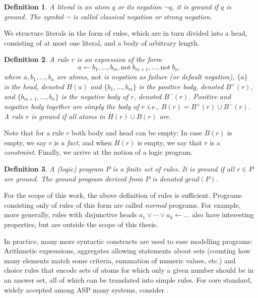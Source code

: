 \documentclass{vutinfth} %
\newtheorem{definition}{Definition}[section]
\newcommand{\headf}{H}
\newcommand{\bodyf}{B}
\newcommand{\fail}{\mathrm{not } \ \xspace}
\newcommand{\from}{\ensuremath{\leftarrow}}
\begin{document}
\begin{definition}
A \emph{literal} is an atom $q$ or its negation $\neg q$, it is \emph{ground} if $q$ is ground. The symbol $\neg$ is called \emph{classical negation} or \emph{strong negation}.
\end{definition}

We structure literals in the form of rules, which are in turn divided into a head, consisting of at most one literal, and a body of arbitrary length.

\begin{definition}
A \emph{rule} $r$ is an expression of the form $$a \from b_1, \ldots, b_m, \fail b_{m+1}, \ldots, \fail b_n.$$ where $a, b_1, \ldots, b_n$ are atoms, $\mathrm{not}$ is \emph{negation as failure} (or \emph{default negation}), $\{ a \}$ is the \emph{head}, denoted $\headf(a)$ and $\{ b_1, \ldots, b_m \}$ is the \emph{positive body}, denoted $\bodyf^+(r)$, and $\{ b_{m+1}, \ldots, b_n \}$ is the \emph{negative body} of $r$, denoted $\bodyf^-(r)$. Positive and negative body together are simply the \emph{body} of $r$ i.e., $\bodyf(r) = \bodyf^+(r)\cup \bodyf^-(r)$.
A rule $r$ is \emph{ground} if all atoms in $\headf(r) \cup \bodyf(r)$ are.
\end{definition}

Note that for a rule $r$ both body and head can be empty: In case $\bodyf(r)$ is empty, we say $r$ is a \emph{fact}, and when $\headf(r)$ is empty, we say that $r$ is a \emph{constraint}. Finally, we arrive at the notion of a logic program.

\begin{definition}
A \emph{(logic) program} $P$ is a finite set of rules. It is \emph{ground} if all $r \in P$ are ground. The ground program derived from $P$ is denoted $grnd(P)$.
\end{definition}

For the scope of this work, the above definition of rules is sufficient. Programs consisting only of rules of this form are called \emph{normal} programs. For example, more generally, rules with disjunctive heads $a_1 \vee \cdots \vee a_k \from \ldots$ also have interesting properties, but are outside the scope of this thesis.

In practice, many more syntactic constructs are used to ease modelling programs: Arithmetic expressions, aggregates allowing statements about sets (counting how many elements match some criteria, summation of numeric values, etc.) and choice rules that encode sets of atoms for which only a given number should be in an answer set, all of which can be translated into simple rules. For core standard, widely accepted among ASP many systems, consider \cite{calimeri2015asp}.
\end{document}
